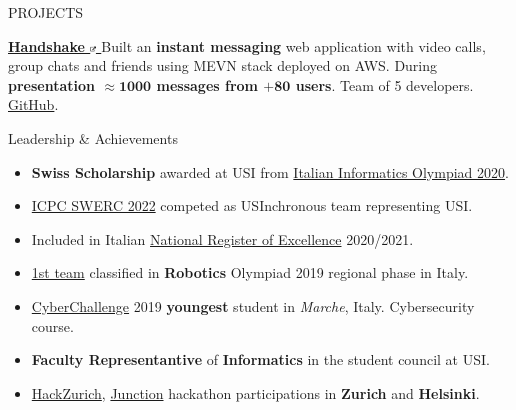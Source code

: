 \documentclass{cv} %
\def\intraexpvspace{0.15cm}
\begin{document}
\begin{minipage}[b][0.9\paperheight][t]{0.7\linewidth}
\begin{rSection}{PROJECTS}
        \vspace{\intraexpvspace}
        \item 
        \textbf{\href{https://github.com/ogs-at-usi/handshake}{ %
                Handshake
                \includegraphics[width=0.15cm, trim={10cm -10cm 0cm 0cm}]{ext-link-icon.png}
            }}
        {Built an \textbf{instant messaging} web application with video calls, group chats and friends
            using MEVN stack deployed on AWS.
            During \textbf{presentation $\boldsymbol{\approx1000}$ messages from $\boldsymbol{+ 80}$ users}.
            Team of 5 developers.
            \href{https://github.com/ogs-at-usi/handshake}{GitHub}.
        }
    \end{rSection}
    \begin{rSection}{Leadership \& Achievements}
        \vspace{0.2cm}
        \begin{itemize}[leftmargin=*]
            \itemsep 0.2em
            \item \textbf{Swiss Scholarship} awarded at USI from
                  \href{https://www.olimpiadi-informatica.it/index.php/selezione-territoriale-20.html}{Italian Informatics Olympiad 2020}.

            \item \href{https://icpc.global/ICPCID/ZOI3HF9XDUH8}{ICPC SWERC 2022}
                  competed as USInchronous team representing USI.

            \item Included in Italian \href{https://www.indire.it/eccellenze/}{National Register of Excellence} 2020/2021.

            \item \href{https://www.makerslab.it/olimpiadi-robotiche-ancona-2019/}{1st team}
                  classified in \textbf{Robotics} Olympiad 2019 regional phase in Italy. %

            \item \href{https://cyberchallenge.it/}{CyberChallenge} 2019 \textbf{youngest} student
                  in \textit{Marche}, Italy. Cybersecurity course. %

            \item \textbf{Faculty Representantive} of \textbf{Informatics} in the student council at USI.

            \item \href{https://hackzurich.com/}{HackZurich},
                  \href{https://www.junction2023.com/}{Junction}
                  hackathon participations in \textbf{Zurich} and \textbf{Helsinki}.
        \end{itemize}
    \end{rSection}

\end{minipage}
\end{document}
